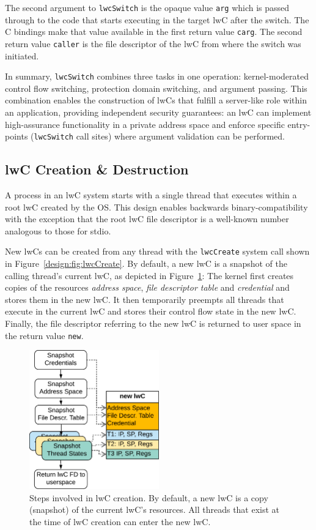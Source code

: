 \documentclass[10pt,twocolumn,a4paper]{article}
\begin{document}
The second argument to \lstinline{lwcSwitch} is the opaque value \lstinline{arg} which is passed through to the code that starts executing in the target lwC after the switch.
The C bindings make that value available in the first return value \lstinline{carg}.
The second return value \lstinline{caller} is the file descriptor of the lwC from where the switch was initiated.
\cite{lwcpaper}

In summary, \lstinline{lwcSwitch} combines three tasks in one operation: kernel-moderated control flow switching, protection domain switching, and argument passing.
This combination enables the construction of lwCs that fulfill a server-like role within an application, providing independent security guarantees:
an lwC can implement high-assurance functionality in a private address space and enforce specific entry-points (\lstinline{lwcSwitch} call sites) where argument validation can be performed.

\subsection{lwC Creation \& Destruction}\label{design:createdestroy}
A process in an lwC system starts with a single thread that executes within a root lwC created by the OS.
This design enables backwards binary-compatibility with the exception that the root lwC file descriptor is a well-known number analogous to those for stdio.
\cite{lwcpaper}

New lwCs can be created from any thread with the \lstinline{lwcCreate} system call shown in Figure~\ref{design:fig:lwcCreate}.
By default, a new lwC is a snapshot of the calling thread's current lwC, as depicted in Figure~\ref{design:fig:lwccreationsequencediagram}:
The kernel first creates copies of the resources \textit{address space}, \textit{file descriptor table} and \textit{credential} and stores them in the new lwC.
It then temporarily preempts all threads that execute in the current lwC and stores their control flow state in the new lwC.
Finally, the file descriptor referring to the new lwC is returned to user space in the return value \lstinline{new}.
\cite{lwcpaper}

\begin{figure}
  \centering
  \includegraphics[height=6cm]{fig/lwc-creation-sequence-diagram}
  \caption{
    Steps involved in lwC creation.
    By default, a new lwC is a copy (snapshot) of the current lwC's resources.
    All threads that exist at the time of lwC creation can enter the new lwC.
  }
\label{design:fig:lwccreationsequencediagram}
\end{figure}
\end{document}
